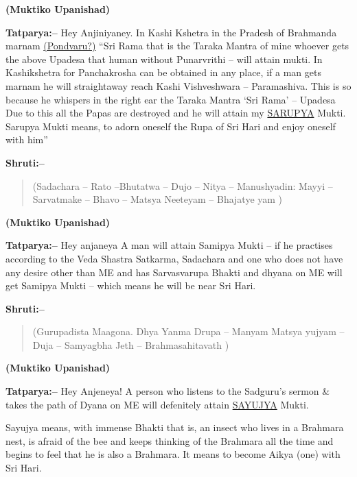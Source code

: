 \begin{flushright}
\textbf{(Muktiko Upanishad)}
\end{flushright}

\textbf{Tatparya:–} Hey Anjiniyaney. In Kashi Kshetra in the Pradesh of Brahmanda marnam \underline{(Pondvaru?)} “Sri Rama that is the Taraka Mantra of mine whoever gets the above Upadesa that human without Punarvrithi – will attain mukti. In Kashikshetra for Panchakrosha can be obtained in any place, if a man gets marnam he will straightaway reach Kashi Vishveshwara – Paramashiva. This is so because he whispers in the right ear the Taraka Mantra ‘Sri Rama’ – Upadesa Due to this all the Papas are destroyed and he will attain my \underline{SARUPYA} Mukti. Sarupya Mukti means, to adorn oneself the Rupa of Sri Hari and enjoy oneself with him”

\textbf{Shruti:–}

\begin{verse}
 (Sadachara – Rato –Bhutatwa – Dujo – Nitya – Manushyadin:  Mayyi – Sarvatmake – Bhavo – Matsya Neeteyam – Bhajatye yam )
\end{verse}

\begin{flushright}
\textbf{(Muktiko Upanishad)}
\end{flushright}

\textbf{Tatparya:–} Hey anjaneya  A man will attain Samipya Mukti – if he practises according to the Veda Shastra Satkarma, Sadachara and one who does not have any desire other than ME and has Sarvasvarupa Bhakti and dhyana on ME will get Samipya Mukti – which means he will be near Sri Hari.

\textbf{Shruti:–}

\begin{verse}
(Gurupadista Maagona. Dhya Yanma Drupa – Manyam  Matsya yujyam – Duja – Samyagbha Jeth – Brahmasahitavath )
\end{verse}

\begin{flushright}
\textbf{(Muktiko Upanishad)}
\end{flushright}

\textbf{Tatparya:–} Hey Anjeneya! A person who listens to the Sadguru's sermon \& takes the path of Dyana on ME will defenitely attain \underline{SAYUJYA} Mukti.

Sayujya means, with immense Bhakti that is, an insect who lives in a Brahmara nest, is afraid of the bee and keeps thinking of the Brahmara all the time and begins to feel that he is also a Brahmara. It means to become Aikya (one) with Sri Hari.

